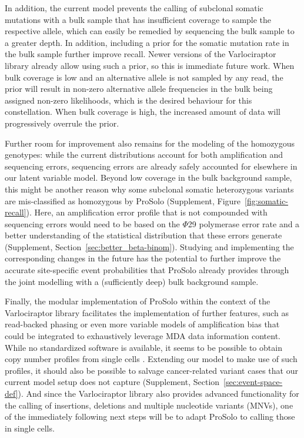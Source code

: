 \documentclass[12pt,inline]{wlscirep}
\begin{document}
In addition, the current model prevents the calling of subclonal somatic mutations with a bulk sample that has insufficient coverage to sample the respective allele, which can easily be remedied by sequencing the bulk sample to a greater depth.
In addition, including a prior for the somatic mutation rate in the bulk sample further improve recall.
Newer versions of the Varlociraptor library\cite{koster_varlociraptor_2020} already allow using such a prior, so this is immediate future work.
When bulk coverage is low and an alternative allele is not sampled by any read, the prior will result in non-zero alternative allele frequencies in the bulk being assigned non-zero likelihoods, which is the desired behaviour for this constellation.
When bulk coverage is high, the increased amount of data will progressively overrule the prior.

Further room for improvement also remains for the modeling of the homozygous genotypes: while the current distributions account for both amplification and sequencing errors, sequencing errors are already safely accounted for elsewhere in our latent variable model.
Beyond low coverage in the bulk background sample, this might be another reason why some subclonal somatic heterozygous variants are mis-classified as homozygous by ProSolo (Supplement, Figure~\ref{fig:somatic-recall}).
Here, an amplification error profile that is not compounded with sequencing errors would need to be based on the $\Phi$29 polymerase error rate and a better understanding of the statistical distribution that these errors generate (Supplement, Section~\ref{sec:better_beta-binom}).
Studying and implementing the corresponding changes in the future has the potential to further improve the accurate site-specific event probabilities that ProSolo already provides through the joint modelling with a (sufficiently deep) bulk background sample.

Finally, the modular implementation of ProSolo within the context of the Varlociraptor library\cite{koster_varlociraptor_2020} facilitates the implementation of further features, such as read-backed phasing\cite{bohrson_linked-read_2019,hard_conbase:_2019} or even more variable models of amplification bias\cite{luquette_identification_2019} that could be integrated to exhaustively leverage MDA data information content.
While no standardized software is available, it seems to be possible to obtain copy number profiles from single cells \cite{baslan_genome-wide_2012,satas_scarlet_2020}.
Extending our model to make use of such profiles, it should also be possible to salvage cancer-related variant cases that our current model setup does not capture (Supplement, Section~\ref{sec:event-space-def}).
And since the Varlociraptor library also provides advanced functionality for the calling of insertions, deletions and multiple nucleotide variants (MNVs), one of the immediately following next steps will be to adapt ProSolo to calling those in single cells.\\
\end{document}
